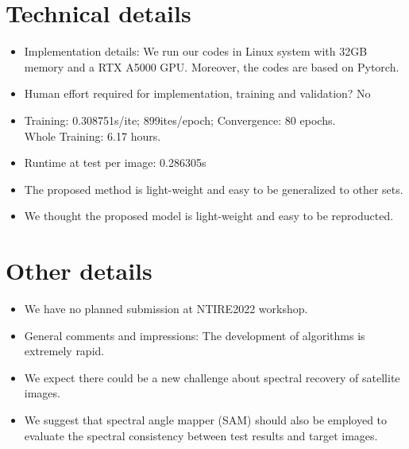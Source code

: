 \documentclass{article}
\begin{document}
\section{Technical details}
\begin{itemize}
\item Implementation details:  We run our codes in Linux system with 32GB memory and a RTX A5000 GPU. Moreover, the codes are based on Pytorch.
\item Human effort required for implementation, training and validation? No
\item Training: 0.308751s/ite; 899ites/epoch; Convergence: 80 epochs. \\Whole Training: 6.17 hours.
\item Runtime at test per image: 0.286305s
\item The proposed method is light-weight and easy to be generalized to other sets.
\item We thought the proposed model is light-weight and easy to be reproducted.
\end{itemize}

\section{Other details}
\begin{itemize}
\item We have no planned submission at NTIRE2022 workshop.
\item General comments and impressions: The development of algorithms is extremely rapid. 
\item We expect there could be a new challenge about spectral recovery of satellite images.  
\item We suggest that spectral angle mapper (SAM) should also be employed to evaluate the spectral consistency between test results and target images.
\end{itemize}


\end{document}
